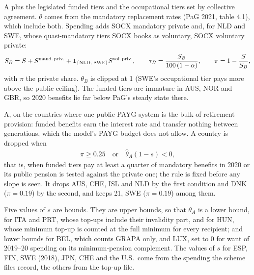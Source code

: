 A plus the legislated funded tiers and the occupational tiers set by collective agreement. $\theta$ comes from the mandatory replacement rates (PaG 2021, table 4.1), which include both. Spending adds SOCX mandatory private and, for NLD and SWE, whose quasi-mandatory tiers SOCX books as voluntary, SOCX voluntary private:
\begin{align}
    S_B = S + S^{\text{mand.\,priv.}} + \mathbf{1}_{\{\text{NLD, SWE}\}}S^{\text{vol.\,priv.}}, \qquad \tau_B = \frac{S_B}{100\,(1-\alpha)}, \qquad \pi = 1 - \frac{S}{S_B}, \label{eq:data:SB}
\end{align}
with $\pi$ the private share. $\theta_B$ is clipped at 1 (SWE's occupational tier pays more above the public ceiling). The funded tiers are immature in AUS, NOR and GBR, so 2020 benefits lie far below PaG's steady state there.

A, on the countries where one public PAYG system is the bulk of retirement provision: funded benefits earn the interest rate and transfer nothing between generations, which the model's PAYG budget does not allow. A country is dropped when
\begin{align}
    \pi \geq 0.25 \quad \text{or} \quad \hat\theta_A (1-s) < 0, \label{eq:data:Crule}
\end{align}
that is, when funded tiers pay at least a quarter of mandatory benefits in 2020 or its public pension is tested against the private one; the rule is fixed before any slope is seen. It drops AUS, CHE, ISL and NLD by the first condition and DNK ($\pi = 0.19$) by the second, and keeps 21, SWE ($\pi = 0.19$) among them.

Five values of $s$ are bounds. They are upper bounds, so that $\theta_A$ is a lower bound, for ITA and PRT, whose top-ups include their invalidity part, and for HUN, whose minimum top-up is counted at the full minimum for every recipient; and lower bounds for BEL, which counts GRAPA only, and LUX, set to 0 for want of 2019--20 spending on its minimum-pension complement. The values of $s$ for ESP, FIN, SWE (2018), JPN, CHE and the U.S.\ come from the spending the scheme files record, the others from the top-up file.
